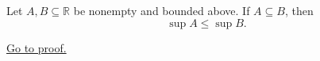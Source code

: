 \begin{theorem}
\label{thm:supremum-is-monotone-under-inclusion}
Let $A,B\subseteq\mathbb{R}$ be nonempty and bounded above. If
$A\subseteq B$, then
\[
  \sup A\leq\sup B.
\]

\hyperref[prf:supremum-is-monotone-under-inclusion]{Go to proof.}
\end{theorem}